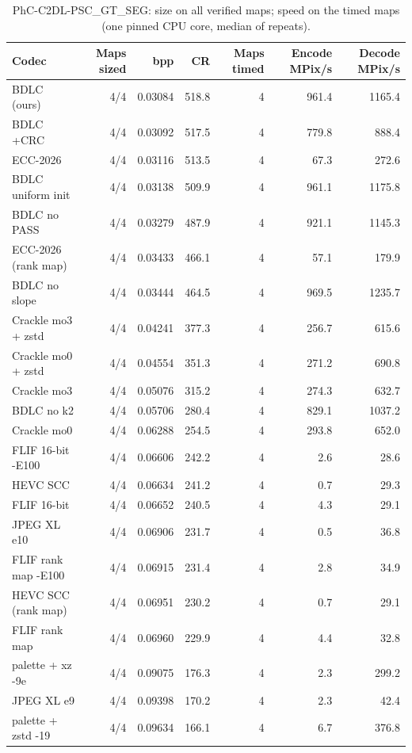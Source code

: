\begin{table}[t]
\centering
\caption{PhC-C2DL-PSC\_GT\_SEG: size on all verified maps; speed on the timed maps (one pinned CPU core, median of repeats).}
\begin{tabular}{lrrrrrr}
\hline
Codec & Maps sized & bpp & CR & Maps timed & Encode MPix/s & Decode MPix/s \\
\hline
BDLC (ours) & 4/4 & 0.03084 & 518.8 & 4 & 961.4 & 1165.4 \\
BDLC +CRC & 4/4 & 0.03092 & 517.5 & 4 & 779.8 & 888.4 \\
ECC-2026 & 4/4 & 0.03116 & 513.5 & 4 & 67.3 & 272.6 \\
BDLC uniform init & 4/4 & 0.03138 & 509.9 & 4 & 961.1 & 1175.8 \\
BDLC no PASS & 4/4 & 0.03279 & 487.9 & 4 & 921.1 & 1145.3 \\
ECC-2026 (rank map) & 4/4 & 0.03433 & 466.1 & 4 & 57.1 & 179.9 \\
BDLC no slope & 4/4 & 0.03444 & 464.5 & 4 & 969.5 & 1235.7 \\
Crackle mo3 + zstd & 4/4 & 0.04241 & 377.3 & 4 & 256.7 & 615.6 \\
Crackle mo0 + zstd & 4/4 & 0.04554 & 351.3 & 4 & 271.2 & 690.8 \\
Crackle mo3 & 4/4 & 0.05076 & 315.2 & 4 & 274.3 & 632.7 \\
BDLC no k2 & 4/4 & 0.05706 & 280.4 & 4 & 829.1 & 1037.2 \\
Crackle mo0 & 4/4 & 0.06288 & 254.5 & 4 & 293.8 & 652.0 \\
FLIF 16-bit -E100 & 4/4 & 0.06606 & 242.2 & 4 & 2.6 & 28.6 \\
HEVC SCC & 4/4 & 0.06634 & 241.2 & 4 & 0.7 & 29.3 \\
FLIF 16-bit & 4/4 & 0.06652 & 240.5 & 4 & 4.3 & 29.1 \\
JPEG XL e10 & 4/4 & 0.06906 & 231.7 & 4 & 0.5 & 36.8 \\
FLIF rank map -E100 & 4/4 & 0.06915 & 231.4 & 4 & 2.8 & 34.9 \\
HEVC SCC (rank map) & 4/4 & 0.06951 & 230.2 & 4 & 0.7 & 29.1 \\
FLIF rank map & 4/4 & 0.06960 & 229.9 & 4 & 4.4 & 32.8 \\
palette + xz -9e & 4/4 & 0.09075 & 176.3 & 4 & 2.3 & 299.2 \\
JPEG XL e9 & 4/4 & 0.09398 & 170.2 & 4 & 2.3 & 42.4 \\
palette + zstd -19 & 4/4 & 0.09634 & 166.1 & 4 & 6.7 & 376.8 \\

\end{tabular}
\end{table}
